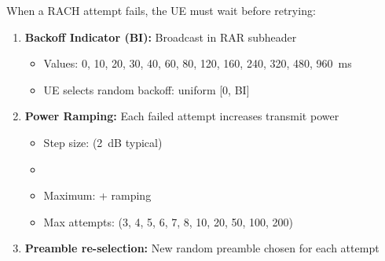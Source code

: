 
When a RACH attempt fails, the UE must wait before retrying:

\begin{enumerate}
\def\labelenumi{\arabic{enumi}.}
\tightlist
\item
  \textbf{Backoff Indicator (BI):} Broadcast in RAR subheader

  \begin{itemize}
  \tightlist
  \item
    Values: 0, 10, 20, 30, 40, 60, 80, 120, 160, 240, 320, 480, 960~ms
  \item
    UE selects random backoff: uniform [0, BI]
  \end{itemize}
\item
  \textbf{Power Ramping:} Each failed attempt increases transmit power

  \begin{itemize}
  \tightlist
  \item
    Step size:  (2~dB typical)
  \item
    \allowbreak{}\allowbreak{}\allowbreak{}
  \item
    Maximum:  + ramping
  \item
    Max attempts:  (3, 4, 5, 6, 7, 8, 10, 20, 50, 100, 200)
  \end{itemize}
\item
  \textbf{Preamble re-selection:} New random preamble chosen for each attempt
\end{enumerate}







\CNchained{}

